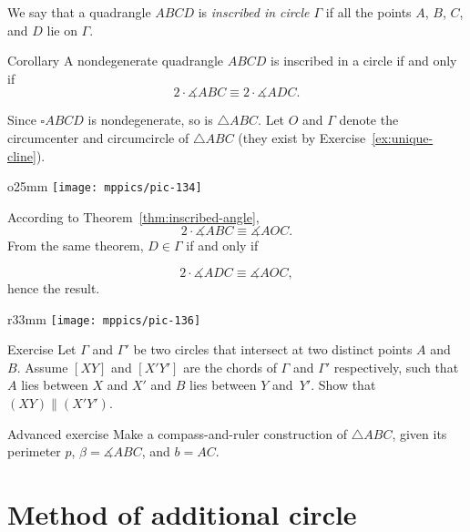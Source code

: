 We say that a quadrangle $ABCD$ is 
\emph{inscribed in circle $\Gamma$}
if all the points $A$, $B$, $C$, and $D$ lie on $\Gamma$.

\begin{thm}{Corollary}\label{cor:inscribed-quadrangle}
A nondegenerate quadrangle $ABCD$ is inscribed in a circle if and only if 
\[2\cdot\measuredangle ABC\equiv 2\cdot\measuredangle ADC.\]

\end{thm}

Since $\square ABCD$ is nondegenerate, so is $\triangle ABC$.
Let $O$ and $\Gamma$ denote the circumcenter and circumcircle of $\triangle ABC$ (they exist by Exercise~\ref{ex:unique-cline}).

{

\begin{wrapfigure}[10]{o}{25mm}
\vskip-0mm
\centering
\texttt{[image: mppics/pic-134]}
\end{wrapfigure}

According to Theorem~\ref{thm:inscribed-angle},
$$
2\cdot\measuredangle ABC
\equiv
\measuredangle AOC.
$$
From the same theorem, $D\in\Gamma$ if and only if 

$$
2\cdot\measuredangle ADC
\equiv\measuredangle AOC,
$$
hence the result.
\qeds

}


{

\begin{wrapfigure}{r}{33mm}
\vskip-6mm
\centering
\texttt{[image: mppics/pic-136]}
\end{wrapfigure}

\begin{thm}{Exercise}\label{ex:secant-circles}
Let $\Gamma$ and $\Gamma'$
be two circles 
that intersect at two distinct points $A$ and~$B$.
Assume $[XY]$ and $[X'Y']$ are the chords of $\Gamma$ and $\Gamma'$ respectively,
such that $A$ lies between $X$ and $X'$ and $B$ lies between $Y$ and~$Y'$.
Show that $(XY)\parallel (X'Y')$.
\end{thm}

}

\begin{thm}{Advanced exercise}\label{ex:perim+angle+side}
Make a compass-and-ruler construction of $\triangle ABC$, given its perimeter $p$, $\beta=\measuredangle ABC$, and $b=AC$.
\end{thm}

\section{Method of additional circle}

